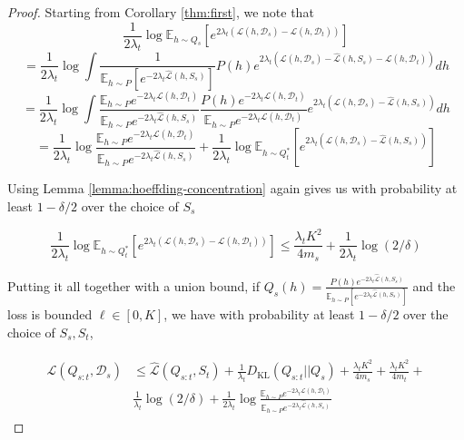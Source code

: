\documentclass{article}
\theoremstyle{plain}
\theoremstyle{definition}
\theoremstyle{remark}
\begin{document}
\begin{proof}
    Starting from Corollary \ref{thm:first}, we note that
    $$\frac{1}{2\lambda_t}\log \mathbb{E}_{h\sim Q_{s}}\left [e^{2\lambda_t(\mathcal{L}(h,\mathcal{D}_s)-\mathcal{L}(h,\mathcal{D}_t))}\right ]$$
    $$=\frac{1}{2\lambda_t}\log \int \frac{1}{\mathbb{E}_{h\sim P}\left [e^{-2\lambda_t\hat{\mathcal{L}}(h,S_s)} \right ]}P(h)e^{2\lambda_t(\mathcal{L}(h,\mathcal{D}_s)-\hat{\mathcal{L}}(h,S_s)-\mathcal{L}(h,\mathcal{D}_t))}dh$$
    $$=\frac{1}{2\lambda_t}\log \int \frac{\mathbb{E}_{h\sim P} e^{-2\lambda_t\mathcal{L}(h,\mathcal{D}_t)}}{\mathbb{E}_{h\sim P} e^{-2\lambda_t\hat{\mathcal{L}}(h,S_s)}  }\frac{P(h)e^{-2\lambda_t\mathcal{L}(h,\mathcal{D}_t)}}{\mathbb{E}_{h\sim P} e^{-2\lambda_t\mathcal{L}(h,\mathcal{D}_t)}}e^{2\lambda_t(\mathcal{L}(h,\mathcal{D}_s)-\hat{\mathcal{L}}(h,S_s))}dh$$
    $$=\frac{1}{2\lambda_t}\log\frac{\mathbb{E}_{h\sim P} e^{-2\lambda_t\mathcal{L}(h,\mathcal{D}_t)}}{\mathbb{E}_{h\sim P} e^{-2\lambda_t\hat{\mathcal{L}}(h,S_s)}  }+\frac{1}{2\lambda_t}\log\mathbb{E}_{h\sim Q^{*}_t}\left [e^{2\lambda_t(\mathcal{L}(h,\mathcal{D}_s)-\hat{\mathcal{L}}(h,S_s))}\right ]$$

    Using Lemma \ref{lemma:hoeffding-concentration} again gives us with probability at least $1-\delta/2$ over the choice of $S_s$

$$\frac{1}{2\lambda_t}\log \mathbb{E}_{h\sim Q^{*}_t}\left [e^{2\lambda_t(\mathcal{L}(h,\mathcal{D}_s)-\mathcal{L}(h,\mathcal{D}_t))}\right ] \leq \frac{\lambda_t K^2}{4m_s}+\frac{1}{2\lambda_t}\log(2/\delta)$$

Putting it all together with a union bound, if $Q_s(h)=\frac{P(h)e^{-2\lambda_t\hat{\mathcal{L}}(h,S_s)}}{\mathbb{E}_{h\sim P}\left [e^{-2\lambda_t\hat{\mathcal{L}}(h,S_s)} \right ]}$ and the loss is bounded $\ell\in[0,K]$, we have with probability at least $1-\delta/2$ over the choice of $S_s,S_t$,

\begin{align}
\begin{split}
\mathcal{L}(Q_{s:t}, \mathcal{D}_s) &\leq \hat{\mathcal{L}}(Q_{s:t}, S_t) + \frac{1}{\lambda_t} D_{\mathrm{KL}}(Q_{s:t}||Q_{s})
+\frac{\lambda_t K^2}{4m_s}+\frac{\lambda_t K^2}{4m_t}+\\&\frac{1}{\lambda_t}\log(2/\delta)+\frac{1}{2\lambda_t}\log\frac{\mathbb{E}_{h\sim P} e^{-2\lambda_t\mathcal{L}(h,\mathcal{D}_t)}}{\mathbb{E}_{h\sim P} e^{-2\lambda_t\hat{\mathcal{L}}(h,S_s)}  }
\end{split}
\end{align}


\end{proof}
\end{document}
